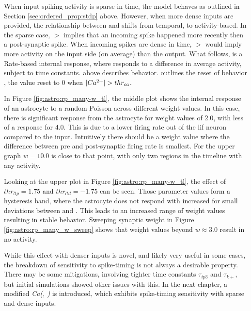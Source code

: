 When input spiking activity is sparse in time, the model behaves as outlined
in Section \ref{sec:ordered_prop:stdp} above. However, when more dense
inputs are provided, the relationship between \ipt and \kp shifts from
temporal, to activity-based. In the sparse case, \ipt $>$ \kp implies that an
incoming spike happened more recently then a post-synaptic spike. When
incoming spikes are dense in time, \ipt $>$ \kp would imply more activity on
the input side (on average) than the output. What follows, is a Rate-based
internal response, where \ca responds to a difference in average activity,
subject to time constants.  above describes \ca
behavior.  outlines the reset of behavior \ca,
the value reset to $0$ when $|Ca^{2+}| > thr_{ca}$.

In Figure \ref{fig:astro:rp_many-w_tl}, the middle plot shows the internal
response of an astrocyte to a random Poisson across different weight values. In
this case, there is significant response from the astrocyte for weight values of
$2.0$, with less of a response for $4.0$. This is due to a lower firing rate out
of the \gls{lif} neuron compared to the input. Intuitively there should be a weight
value where the difference between pre and post-synaptic firing rate is
smallest. For the upper graph $w=10.0$ is close to that point, with only two
regions in the timeline with any activity.


Looking at the upper plot in Figure \ref{fig:astro:rp_many-w_tl}, the effect of
$thr_{ltp}=1.75$ and $thr_{ltd}=-1.75$ can be seen. Those parameter values form
a hysteresis band, where the astrocyte does not respond with increased \ca for
small deviations between \ipt and \kp. This leads to an increased range of
weight values resulting in stable behavior. Sweeping synaptic weight in Figure
\ref{fig:astro:rp_many_w_sweep} shows that weight values beyond $w \approx 3.0$
result in no \ca activity.


While this effect with denser inputs is novel, and likely very useful in some
cases, the breakdown of sensitivity to spike-timing is not always a desirable
property. There may be some mitigations, involving tighter time constants
$\tau_{ip3}$ and $\tau_{k+}$, but initial simulations showed other issues with
this. In the next chapter, a modified \emph{Ca(\ipt, \kp)} is introduced, which
exhibits spike-timing sensitivity with sparse and dense inputs.

